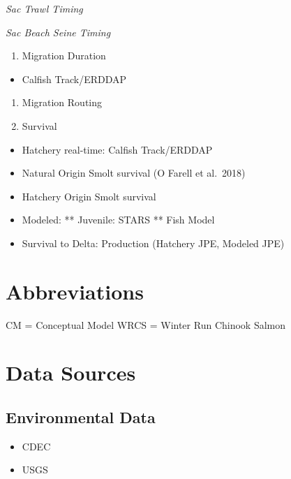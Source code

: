 \documentclass[
]{book}
\providecommand{\tightlist}{%
  \setlength{\itemsep}{0pt}\setlength{\parskip}{0pt}}
\theoremstyle{definition}
\theoremstyle{definition}
\theoremstyle{definition}
\theoremstyle{definition}
\theoremstyle{remark}
\begin{document}
\emph{Sac Trawl Timing}

\emph{Sac Beach Seine Timing}

\begin{enumerate}
\def\labelenumi{\arabic{enumi}.}
\setcounter{enumi}{3}
\tightlist
\item
  Migration Duration
\end{enumerate}

\begin{itemize}
\tightlist
\item
  Calfish Track/ERDDAP
\end{itemize}

\begin{enumerate}
\def\labelenumi{\arabic{enumi}.}
\setcounter{enumi}{4}
\item
  Migration Routing
\item
  Survival
\end{enumerate}

\begin{itemize}
\tightlist
\item
  Hatchery real-time: Calfish Track/ERDDAP
\item
  Natural Origin Smolt survival (O Farell et al.~2018)
\item
  Hatchery Origin Smolt survival
\item
  Modeled: ** Juvenile: STARS ** Fish Model
\item
  Survival to Delta: Production (Hatchery JPE, Modeled JPE)
\end{itemize}

\hypertarget{abbreviations}{%
\chapter{Abbreviations}\label{abbreviations}}

CM = Conceptual Model
WRCS = Winter Run Chinook Salmon

\hypertarget{data-sources}{%
\chapter{Data Sources}\label{data-sources}}

\hypertarget{environmental-data}{%
\section{Environmental Data}\label{environmental-data}}

\begin{itemize}
\tightlist
\item
  CDEC
\item
  USGS
\end{itemize}
\end{document}
